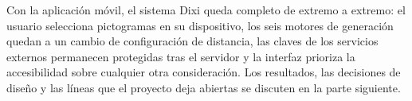 Con la aplicación móvil, el sistema Dixi queda completo de extremo a extremo: el usuario selecciona pictogramas en su dispositivo, los seis motores de generación quedan a un cambio de configuración de distancia, las claves de los servicios externos permanecen protegidas tras el servidor y la interfaz prioriza la accesibilidad sobre cualquier otra consideración. Los resultados, las decisiones de diseño y las líneas que el proyecto deja abiertas se discuten en la parte siguiente.
